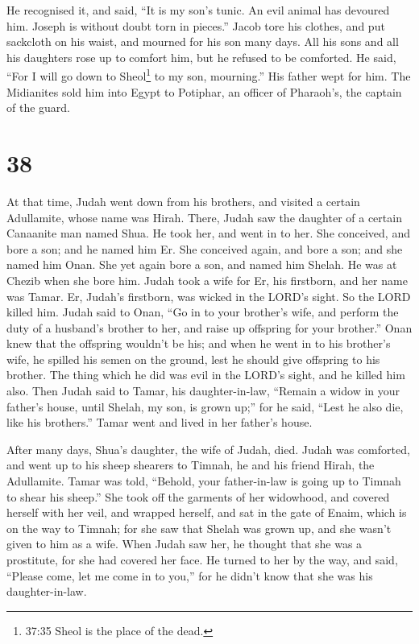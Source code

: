  He recognised it, and said, ``It is my son's tunic. An
evil animal has devoured him. Joseph is without doubt torn in pieces.''
 Jacob tore his clothes, and put sackcloth on his waist,
and mourned for his son many days.  All his sons and all
his daughters rose up to comfort him, but he refused to be comforted. He
said, ``For I will go down to Sheol\footnote{37:35 Sheol is the place of
  the dead.} to my son, mourning.'' His father wept for him.
 The Midianites sold him into Egypt to Potiphar, an officer
of Pharaoh's, the captain of the guard.

\hypertarget{section-37}{%
\section{38}\label{section-37}}

 At that time, Judah went down from his brothers, and
visited a certain Adullamite, whose name was Hirah.  There,
Judah saw the daughter of a certain Canaanite man named Shua. He took
her, and went in to her.  She conceived, and bore a son; and
he named him Er.  She conceived again, and bore a son; and
she named him Onan.  She yet again bore a son, and named him
Shelah. He was at Chezib when she bore him.  Judah took a
wife for Er, his firstborn, and her name was Tamar.  Er,
Judah's firstborn, was wicked in the LORD's sight. So the LORD killed
him.  Judah said to Onan, ``Go in to your brother's wife,
and perform the duty of a husband's brother to her, and raise up
offspring for your brother.''  Onan knew that the offspring
wouldn't be his; and when he went in to his brother's wife, he spilled
his semen on the ground, lest he should give offspring to his brother.
 The thing which he did was evil in the LORD's sight, and
he killed him also.  Then Judah said to Tamar, his
daughter-in-law, ``Remain a widow in your father's house, until Shelah,
my son, is grown up;'' for he said, ``Lest he also die, like his
brothers.'' Tamar went and lived in her father's house.

 After many days, Shua's daughter, the wife of Judah, died.
Judah was comforted, and went up to his sheep shearers to Timnah, he and
his friend Hirah, the Adullamite.  Tamar was told,
``Behold, your father-in-law is going up to Timnah to shear his sheep.''
 She took off the garments of her widowhood, and covered
herself with her veil, and wrapped herself, and sat in the gate of
Enaim, which is on the way to Timnah; for she saw that Shelah was grown
up, and she wasn't given to him as a wife.  When Judah saw
her, he thought that she was a prostitute, for she had covered her face.
 He turned to her by the way, and said, ``Please come, let
me come in to you,'' for he didn't know that she was his
daughter-in-law.

